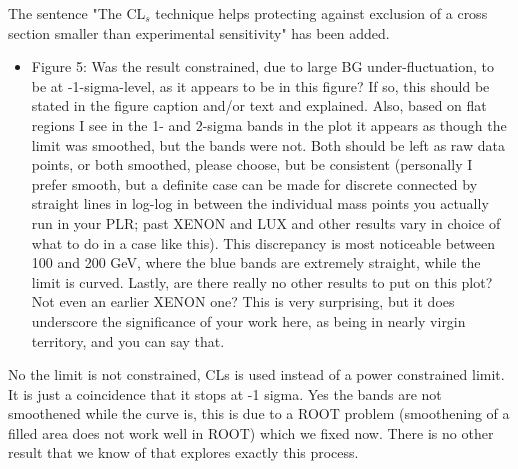 \documentclass{article}
\begin{document}
The sentence "The CL$_s$ technique helps protecting against exclusion 
of a cross section smaller than experimental sensitivity" has been added.  



\begin{itemize}
	\item {\color{blue} 
Figure 5: Was the result constrained, due to large BG
under-fluctuation, to be at -1-sigma-level, as it appears to be in
this figure? If so, this should be stated in the figure caption and/or
text and explained. Also, based on flat regions I see in the 1- and
2-sigma bands in the plot it appears as though the limit was smoothed,
but the bands were not. Both should be left as raw data points, or
both smoothed, please choose, but be consistent (personally I prefer
smooth, but a definite case can be made for discrete connected by
straight lines in log-log in between the individual mass points you
actually run in your PLR; past XENON and LUX and other results vary in
choice of what to do in a case like this). This discrepancy is most
noticeable between 100 and 200 GeV, where the blue bands are extremely
straight, while the limit is curved. Lastly, are there really no other
results to put on this plot? Not even an earlier XENON one? This is
very surprising, but it does underscore the significance of your work
here, as being in nearly virgin territory, and you can say that.}
\end{itemize}

No the limit is not constrained, CLs is used instead of a power constrained limit.
It is just a coincidence that it stops at -1 sigma.
Yes the bands are not smoothened while the curve is, this is due to a ROOT 
problem (smoothening of a filled area does not work well in ROOT) which we  
fixed now. There is no other result that we know of that explores 
exactly this process.
\end{document}
